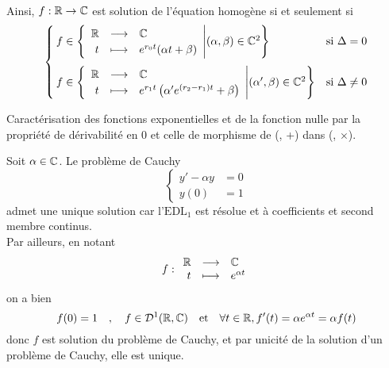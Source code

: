 \documentclass{article}
\renewenvironment{question_kholle}[2][ ]
{
	\subsection{\texorpdfstring{#2}{}}
	\notblank{#1}
	{
		\noindent #1
		\bigbreak
	}
	{}
	\begin{proof}
}
{
	\end{proof}
}
\begin{document}
\begin{question_kholle}
\begin{align*}
	\end{align*}
	Ainsi, $f:\mathbb R\rightarrow\mathbb C$ est solution de l'équation homogène si et seulement si
	\[
		\begin{cases}
			f\in \left\{\begin{array}{rcl} \mathbb R & \longrightarrow & \mathbb C \\ t & \longmapsto & e^{r_{0}t}(\alpha t+\beta) \end{array} \middle| (\alpha, \beta)\in\mathbb C^{2}\right\}                                 & \text{si $\Delta=0$}     \\[15pt]
			f\in \left\{\begin{array}{rcl} \mathbb R & \longrightarrow & \mathbb C \\ t & \longmapsto & e^{r_{1}t}\left(\alpha ' e^{(r_{2}-r_{1})t}+\beta\right) \end{array} \middle| (\alpha ', \beta)\in\mathbb C^{2}\right\} & \text{si $\Delta\neq 0$}
		\end{cases}
	\]
\end{question_kholle}

\begin{question_kholle}[{
				\begin{propositions}
					\item \textit{Comme solution d’un problème de Cauchy.} Soit $\alpha\in\C$.
					\[
						\applic{\R}{\C}{t}{e^{\alpha t}} \text{ est l’unique solution de } \begin{cases}
							y'-\alpha y & =0 \\
							y(0)        & =1
						\end{cases}
					\]
					\item \textit{Par la propriété de morphisme et de non-annulation.}
					\begin{multline}
						\left\{f:\R\longrightarrow\C \middle| f \text{ dérivable en 0 et } \forall (s,u)\in\R^{2}, f(s+u)=f(s)f(u)\right\} \\=\{\widetilde{0}\}\cup \left\{\applic{\R}{\C}{t}{e^{\alpha t}}\middle| \alpha\in\C\right\}
					\end{multline}
				\end{propositions}
			}]{Caractérisation des fonctions exponentielles et de la fonction nulle par la propriété de dérivabilité en 0 et celle de morphisme de (\R, +) dans (\C, $\times$).}
	\hfill\\
	\begin{propositions}
		\item Soit $\alpha\in\C$. Le problème de Cauchy
		\[
			\begin{cases}
				y'-\alpha y & =0 \\
				y(0)        & =1
			\end{cases}
		\]
		admet une unique solution car l’$\mathrm{EDL_{1}}$ est résolue et à coefficients et second membre continus.\\
		Par ailleurs, en notant
		\[
			f:\begin{array}{rcl} \mathbb R & \longrightarrow & \mathbb C \\ t & \longmapsto & e^{\alpha t} \end{array}
		\]
		on a bien
		\[
			f(0)=1 \quad , \quad f\in\mathcal{D}^{1}(\mathbb R,\mathbb C) \quad\text{et}\quad \forall t\in\mathbb R, f'(t)=\alpha e^{\alpha t}=\alpha f(t)
		\]
		donc $f$ est solution du problème de Cauchy, et par unicité de la solution d’un problème de Cauchy, elle est unique.


\end{propositions}
\end{question_kholle}
\end{document}
